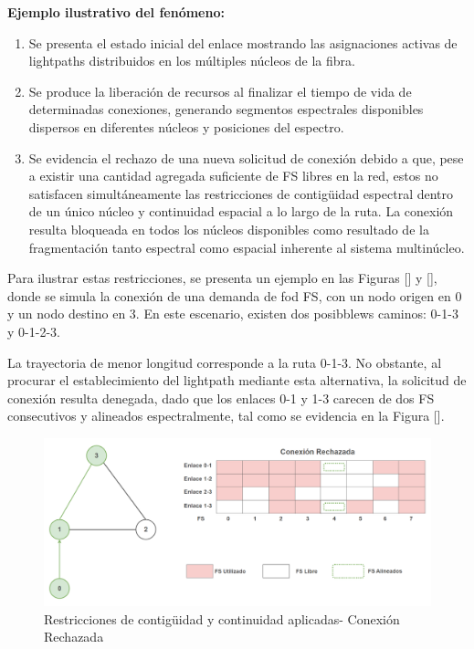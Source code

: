 \textbf{Ejemplo ilustrativo del fenómeno:}
\begin{enumerate}[1 -]
   \item Se presenta el estado inicial del enlace mostrando las asignaciones activas de lightpaths distribuidos en los múltiples núcleos de la fibra.
   \item Se produce la liberación de recursos al finalizar el tiempo de vida de determinadas conexiones, generando segmentos espectrales disponibles dispersos en diferentes núcleos y posiciones del espectro.
   \item Se evidencia el rechazo de una nueva solicitud de conexión debido a que, pese a existir una cantidad agregada suficiente de FS libres en la red, estos no satisfacen simultáneamente las restricciones de contigüidad espectral dentro de un único núcleo y continuidad espacial a lo largo de la ruta. La conexión resulta bloqueada en todos los núcleos disponibles como resultado de la fragmentación tanto espectral como espacial inherente al sistema multinúcleo.  
\end{enumerate}
%

Para ilustrar estas restricciones, se presenta un ejemplo en las Figuras [] y [], donde se simula la conexión de una demanda de fod FS, con un nodo origen en 0 y un nodo destino en 3. En este escenario, existen dos posibblews caminos: 0-1-3 y 0-1-2-3.
%

La trayectoria de menor longitud corresponde a la ruta 0-1-3. No obstante, al procurar el establecimiento del lightpath mediante esta alternativa, la solicitud de conexión resulta denegada, dado que los enlaces 0-1 y 1-3 carecen de dos FS consecutivos y alineados espectralmente, tal como se evidencia en la Figura [].
%


\begin{figure}[H]
    \centering
    \includegraphics[width=1\textwidth]{capitulos/img/fragmentacionNuevo.png}
    \caption{Restricciones de contigüidad y continuidad aplicadas- Conexión Rechazada}
    \label{fig:fragmentacionNueva}
\end{figure}


